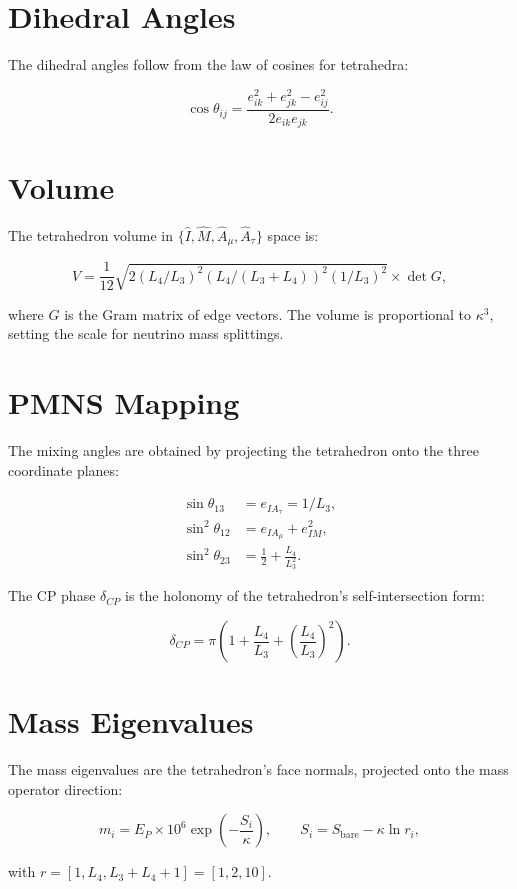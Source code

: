 \section{Dihedral Angles}

The dihedral angles follow from the law of cosines for tetrahedra:

\[
\cos\theta_{ij} = \frac{e_{ik}^2 + e_{jk}^2 - e_{ij}^2}{2 e_{ik} e_{jk}}.
\]

\section{Volume}

The tetrahedron volume in $\{\hat I, \hat M, \hat A_\mu, \hat A_\tau\}$
space is:

\[
V = \frac{1}{12}\sqrt{2(L_4/L_3)^2(L_4/(L_3+L_4))^2(1/L_3)^2}
  \times \det G,
\]

where $G$ is the Gram matrix of edge vectors.  The volume is proportional
to $\kappa^3$, setting the scale for neutrino mass splittings.

\section{PMNS Mapping}

The mixing angles are obtained by projecting the tetrahedron onto the
three coordinate planes:

\[
\begin{aligned}
\sin\theta_{13} &= e_{IA_\tau} = 1/L_3, \\[4pt]
\sin^2\theta_{12} &= e_{IA_\mu} + e_{IM}^2, \\[4pt]
\sin^2\theta_{23} &= \frac12 + \frac{L_4}{L_3^2}.
\end{aligned}
\]

The CP phase $\delta_{CP}$ is the holonomy of the tetrahedron's
self-intersection form:

\[
\delta_{CP} = \pi\left(1 + \frac{L_4}{L_3} + \left(\frac{L_4}{L_3}\right)^2\right).
\]

\section{Mass Eigenvalues}

The mass eigenvalues are the tetrahedron's face normals, projected onto
the mass operator direction:

\[
m_i = E_P \times 10^6 \exp\left(-\frac{S_i}{\kappa}\right),
\qquad
S_i = S_{\text{bare}} - \kappa \ln r_i,
\]

with $r = [1, L_4, L_3+L_4+1] = [1, 2, 10]$.
